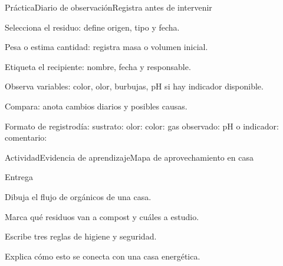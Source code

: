 \documentclass{../plantilla/hvtbook}
\begin{document}
\begin{HVTPage}{Práctica}{Diario de observación}{Registra antes de intervenir}
\begin{HVTSteps}\item Selecciona el residuo: define origen, tipo y fecha. \item Pesa o estima cantidad: registra masa o volumen inicial. \item Etiqueta el recipiente: nombre, fecha y responsable. \item Observa variables: color, olor, burbujas, pH si hay indicador disponible. \item Compara: anota cambios diarios y posibles causas.\end{HVTSteps}
\begin{HVTCode}{Formato de registro}día:
sustrato:
olor:
color:
gas observado:
pH o indicador:
comentario:\end{HVTCode}
\end{HVTPage}
\begin{HVTPage}{Actividad}{Evidencia de aprendizaje}{Mapa de aprovechamiento en casa}
\begin{HVTTask}{Entrega}\item Dibuja el flujo de orgánicos de una casa. \item Marca qué residuos van a compost y cuáles a estudio. \item Escribe tres reglas de higiene y seguridad. \item Explica cómo esto se conecta con una casa energética.\end{HVTTask}
\end{HVTPage}
\end{document}
